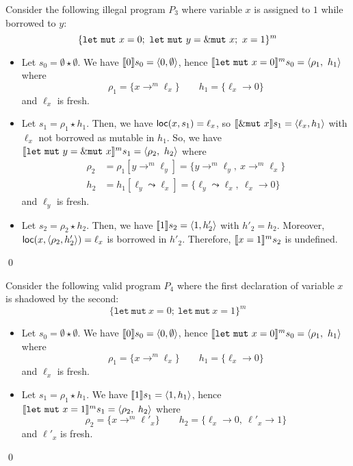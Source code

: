 \begin{example}
  Consider the following illegal program $P_3$
  where variable $x$ is assigned to $1$ while
  borrowed to $y$:
  \[
    \{
      \mathtt{let\ mut}\ x = 0;\
      \mathtt{let\ mut}\ y = \mutborrow x;\
      x = 1
    \}^m
  \]
  \begin{itemize}
    \item Let $s_0=\emptyset \star \emptyset$.
    We have $\den[0]{s_0} = \langle 0,\emptyset\rangle$, hence
    $\denl[\mathtt{let\ mut}\ x = 0]{m}{s_0} =
    \langle \rho_1,\ h_1\rangle$ where
    \[\rho_1=\{x\to^m\ell_x\} \qquad
    h_1 = \{\ell_x\to 0\}\]
    and $\ell_x$ is fresh.
    \item Let $s_1 = \rho_1 \star h_1$.
    Then, we have $\loc(x,s_1) = \ell_x$, so
    $\den[\mutborrow x]{s_1} = \langle \ell_x,h_1\rangle$
    with $\ell_x$ not borrowed as mutable in $h_1$.
    So, we have
    $\denl[\mathtt{let\ mut}\ y = \mutborrow x]{m}{s_1} =
    \langle \rho_2,\ h_2\rangle$
    where
    \begin{align*}
      \rho_2 & = \rho_1[y\to^m\ell_y] = \{y\to^m\ell_y,\ x\to^m\ell_x\}\\
      h_2 & = h_1[\ell_y\leadsto \ell_x] =
      \{\ell_y\leadsto \ell_x,\ \ell_x\to 0\}
    \end{align*}
    and $\ell_y$ is fresh.
    \item Let $s_2 = \rho_2 \star h_2$.
    Then, we have $\den[1]{s_2} = \langle 1,h'_2\rangle$ with $h'_2=h_2$.
    Moreover, $\loc(x,\langle\rho_2,h'_2\rangle) = \ell_x$ is borrowed in $h'_2$.
    Therefore, $\denl[x = 1]{m}{s_2}$ is undefined.
  \end{itemize}
  \qed
\end{example}

\begin{example}
  Consider the following valid program $P_4$
  where the first declaration of variable $x$ is
  shadowed by the second:
  \[
    \{
      \mathtt{let\ mut}\ x = 0;\
      \mathtt{let\ mut}\ x = 1
    \}^m
  \]
  \begin{itemize}
    \item Let $s_0=\emptyset \star \emptyset$.
    We have $\den[0]{s_0} = \langle 0,\emptyset\rangle$, hence
    $\denl[\mathtt{let\ mut}\ x = 0]{m}{s_0} =
    \langle \rho_1,\ h_1\rangle$ where
    \[\rho_1=\{x\to^m\ell_x\} \qquad
    h_1 = \{\ell_x\to 0\}\]
    and $\ell_x$ is fresh.
    \item Let $s_1 = \rho_1 \star h_1$.
    We have $\den[1]{s_1} = \langle 1,h_1\rangle$, hence
    $\denl[\mathtt{let\ mut}\ x = 1]{m}{s_1} =
    \langle \rho_2,\ h_2\rangle$ where
    \[\rho_2=\{x\to^m\ell'_x\} \qquad
    h_2 = \{\ell_x\to 0,\ \ell'_x\to 1\}\]
    and $\ell'_x$ is fresh.
  \end{itemize}
  \qed
\end{example}

